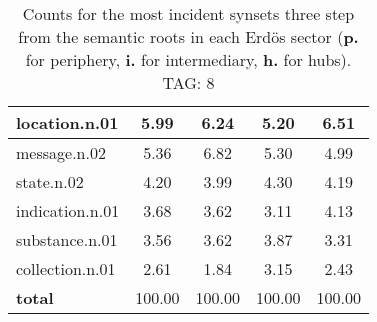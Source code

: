 \begin{table}[h!]
\begin{center}
\begin{tabular}{| l || c | c | c | c |}
location.n.01 & 5.99  & 6.24  & 5.20  & 6.51 \\\hline
message.n.02 & 5.36  & 6.82  & 5.30  & 4.99 \\\hline
state.n.02 & 4.20  & 3.99  & 4.30  & 4.19 \\\hline
indication.n.01 & 3.68  & 3.62  & 3.11  & 4.13 \\\hline
substance.n.01 & 3.56  & 3.62  & 3.87  & 3.31 \\\hline
collection.n.01 & 2.61  & 1.84  & 3.15  & 2.43 \\\hline\hline
{{\bf total}} & 100.00  & 100.00  & 100.00  & 100.00 \\\hline
\end{tabular}
\caption{Counts for the most incident synsets three step from the semantic roots in each Erd\"os sector ({\bf p.} for periphery, {\bf i.} for intermediary, {\bf h.} for hubs). TAG: 8}
\end{center}
\end{table}